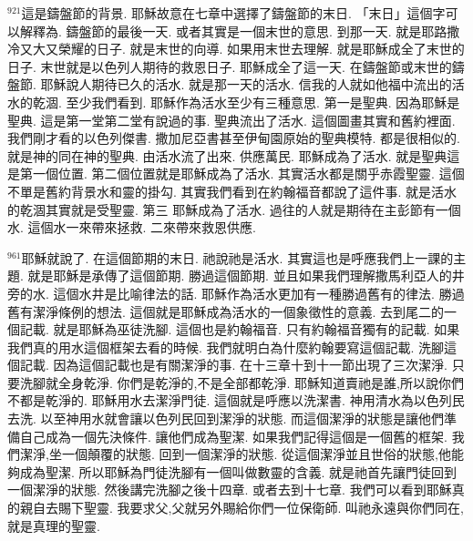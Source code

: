 \documentclass{book}
\begin{document}
$^{921}$這是鑄盤節的背景.
耶穌故意在七章中選擇了鑄盤節的末日.
「末日」這個字可以解釋為.
鑄盤節的最後一天.
或者其實是一個末世的意思.
到那一天.
就是耶路撒冷又大又榮耀的日子.
就是末世的向導.
如果用末世去理解.
就是耶穌成全了末世的日子.
末世就是以色列人期待的救恩日子.
耶穌成全了這一天.
在鑄盤節或末世的鑄盤節.
耶穌說人期待已久的活水.
就是那一天的活水.
信我的人就如他福中流出的活水的乾涸.
至少我們看到.
耶穌作為活水至少有三種意思.
第一是聖典.
因為耶穌是聖典.
這是第一堂第二堂有說過的事.
聖典流出了活水.
這個圖畫其實和舊約裡面.
我們剛才看的以色列傑書.
撒加尼亞書甚至伊甸園原始的聖典模特.
都是很相似的.
就是神的同在神的聖典.
由活水流了出來.
供應萬民.
耶穌成為了活水.
就是聖典這是第一個位置.
第二個位置就是耶穌成為了活水.
其實活水都是關乎赤霞聖靈.
這個不單是舊約背景水和靈的掛勾.
其實我們看到在約翰福音都說了這件事.
就是活水的乾涸其實就是受聖靈.
第三 耶穌成為了活水.
過往的人就是期待在主彭節有一個水.
這個水一來帶來拯救.
二來帶來救恩供應.

$^{961}$耶穌就說了.
在這個節期的末日.
祂說祂是活水.
其實這也是呼應我們上一課的主題.
就是耶穌是承傳了這個節期.
勝過這個節期.
並且如果我們理解撒馬利亞人的井旁的水.
這個水井是比喻律法的話.
耶穌作為活水更加有一種勝過舊有的律法.
勝過舊有潔淨條例的想法.
這個就是耶穌成為活水的一個象徵性的意義.
去到尾二的一個記載.
就是耶穌為巫徒洗腳.
這個也是約翰福音.
只有約翰福音獨有的記載.
如果我們真的用水這個框架去看的時候.
我們就明白為什麼約翰要寫這個記載.
洗腳這個記載.
因為這個記載也是有關潔淨的事.
在十三章十到十一節出現了三次潔淨.
只要洗腳就全身乾淨.
你們是乾淨的,不是全部都乾淨.
耶穌知道賣祂是誰,所以說你們不都是乾淨的.
耶穌用水去潔淨門徒.
這個就是呼應以洗潔書.
神用清水為以色列民去洗.
以至神用水就會讓以色列民回到潔淨的狀態.
而這個潔淨的狀態是讓他們準備自己成為一個先決條件.
讓他們成為聖潔.
如果我們記得這個是一個舊的框架.
我們潔淨,坐一個顛覆的狀態.
回到一個潔淨的狀態.
從這個潔淨並且世俗的狀態,他能夠成為聖潔.
所以耶穌為門徒洗腳有一個叫做數靈的含義.
就是祂首先讓門徒回到一個潔淨的狀態.
然後講完洗腳之後十四章.
或者去到十七章.
我們可以看到耶穌真的親自去賜下聖靈.
我要求父,父就另外賜給你們一位保衛師.
叫祂永遠與你們同在,就是真理的聖靈.
\end{document}
